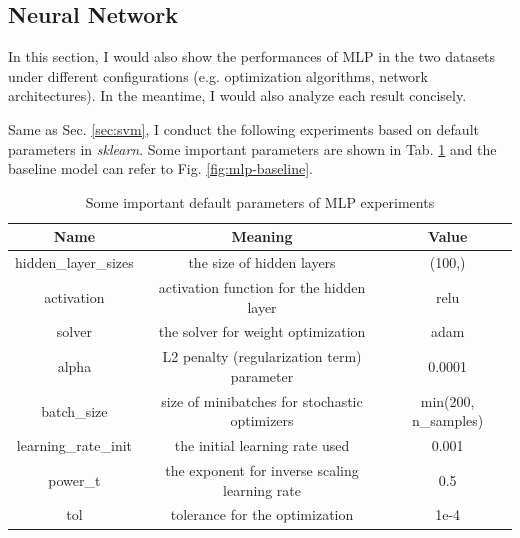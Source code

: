 \documentclass[12pt,a4paper]{article}
\theoremstyle{definition}
\begin{document}
\subsection{Neural Network}

In this section, I would also show the performances of MLP in the two datasets under different configurations (e.g. optimization algorithms, network architectures). In the meantime, I would also analyze each result concisely.

\vspace{0.01\linewidth}
Same as Sec. \ref{sec:svm}, I conduct the following experiments based on default parameters in \textit{sklearn}. Some important parameters are shown in Tab. \ref{tab:default-para-mlp} and the baseline model can refer to Fig. \ref{fig:mlp-baseline}.

\begin{table}[H]
	\renewcommand\arraystretch{1.35}
	\caption{Some important default parameters of MLP experiments}
	\label{tab:default-para-mlp}
	\centering
	
	\begin{tabular}{c|c|c}
		\centering
		Name & Meaning & Value \\
		\hline
		\hline
		
		hidden\_layer\_sizes & the size of hidden layers & (100,) \\
		activation & activation function for the hidden layer & relu \\
		solver & the solver for weight optimization & adam \\
		alpha & L2 penalty (regularization term) parameter & 0.0001 \\
		batch\_size & size of minibatches for stochastic optimizers & min(200, n\_samples) \\
		learning\_rate\_init & the initial learning rate used & 0.001 \\
		power\_t & the exponent for inverse scaling learning rate & 0.5 \\
		tol & tolerance for the optimization & 1e-4 \\
		
	\end{tabular}
\end{table}
\end{document}
